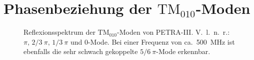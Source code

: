 \section{Phasenbeziehung der $\mathrm{TM}_{010}$-Moden}
\label{app:tm010_moden}
\FloatBarrier
\begin{figure}[htbp]
	\centering
	
	\caption[Reflexionsspektrum der $\mathrm{TM}_{010}$-Moden von PETRA-III]{Reflexionsspektrum der $\mathrm{TM}_{010}$-Moden von PETRA-III. V.\ l.\ n.\ r.: $\pi,\, 2/3~\pi, \, 1/3~\pi$ und $0$-Mode. Bei einer Frequenz von ca.\ \SI{500}{MHz} ist ebenfalls die sehr schwach gekoppelte $5/6~\pi$-Mode erkennbar.}
	\label{fig:spektrum_tm010}
\end{figure}

